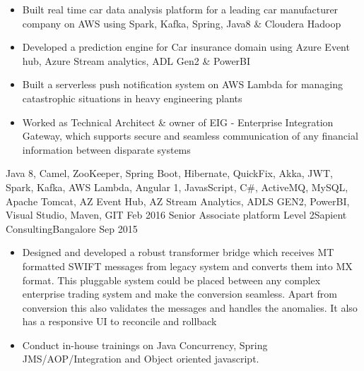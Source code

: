 \begin{experiences}
{\begin{itemize}
                        \item Built real time car data analysis platform for a leading car manufacturer company on AWS using Spark, Kafka, Spring, Java8 \& Cloudera Hadoop
                        \item Developed a prediction engine for Car insurance domain using Azure Event hub, Azure Stream analytics, ADL Gen2 \& PowerBI 
                        \item Built a serverless push notification system on AWS Lambda for managing catastrophic situations in heavy engineering plants
                        \item Worked as Technical Architect \& owner of EIG - Enterprise Integration Gateway, which supports secure and seamless communication of any financial information between disparate systems   
                      \end{itemize}
                    }
                    {Java 8, Camel, ZooKeeper, Spring Boot, Hibernate, QuickFix, Akka, JWT, Spark, Kafka, AWS Lambda, Angular 1, JavasScript, C\#, ActiveMQ, MySQL, Apache Tomcat, AZ Event Hub, AZ Stream Analytics, ADLS GEN2, PowerBI, Visual Studio, Maven, GIT}
  \emptySeparator
  \experience
    {Feb 2016} {Senior Associate platform Level 2}{Sapient Consulting}{Bangalore}
    {Sep 2015}    {
                      \begin{itemize}
                        \item Designed and developed a robust transformer bridge which receives MT formatted SWIFT messages from legacy system and converts them into MX format. This pluggable system could be placed between any complex enterprise trading system and make the conversion seamless. Apart from conversion this also validates the messages and handles the anomalies. It also has a responsive UI to reconcile and rollback                           
                        \item Conduct in-house trainings on Java Concurrency, Spring JMS/AOP/Integration and Object oriented javascript.                        
                                                                     

\end{itemize}}
\end{experiences}
